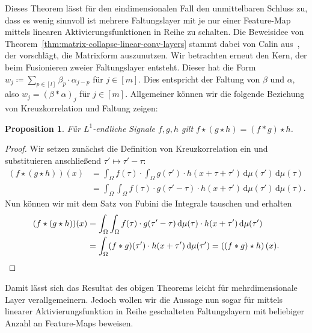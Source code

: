 \documentclass[paper=a4, 	%
		fontsize=11pt,
		abstract=true, 	%
		headsepline, 	%
		notitlepage	%
		]{scrartcl}
\newtheorem{proposition}[theorem]{Proposition}
\theoremstyle{definition}
\newcommand{\diff}{\,\textrm{d}}
\newcommand{\fNat}[1]{[ #1 ]}
\begin{document}
Dieses Theorem lässt für den eindimensionalen Fall den unmittelbaren Schluss zu, dass es wenig sinnvoll ist mehrere Faltungslayer mit je nur einer Feature-Map mittels linearen Aktivierungsfunktionen in Reihe zu schalten.
Die Beweisidee von Theorem~\ref{thm:matrix-collapse-linear-conv-layers} stammt dabei von Calin aus~\cite{Calin2020}, der vorschlägt, die Matrixform auszunutzen.
Wir betrachten erneut den Kern, der beim Fusionieren zweier Faltungslayer entsteht.
Dieser hat die Form $w_j \coloneqq \sum_{p\in\fNat{l}} \beta_p \cdot \alpha_{j-p}$ für $j\in\fNat{m}$.
Dies entspricht der Faltung von $\beta$ und $\alpha$, also $w_j = (\beta * \alpha)_j$ für $j\in\fNat{m}$.
Allgemeiner können wir die folgende Beziehung von Kreuzkorrelation und Faltung zeigen:
\begin{proposition}\label{prop:associativity-cross-corr}
    Für $L^1$-endliche Signale $f,g,h$ gilt $f\star (g \star h) = (f*g)\star h$.
\end{proposition}
\begin{proof}
    Wir setzen zunächst die Definition von Kreuzkorrelation ein und substituieren anschließend $\tau' \mapsto \tau' - \tau$:
    \begin{align*}
        (f\star (g\star h))(x)
        &= \int_\Omega f(\tau) \cdot \int_\Omega g(\tau') \cdot h(x+\tau+\tau')\diff\mu(\tau') \diff \mu(\tau) \\
        &= \int_\Omega \int_\Omega f(\tau) \cdot g(\tau' - \tau)\cdot h(x+\tau')\diff\mu(\tau') \diff \mu(\tau).
    \end{align*}
    Nun können wir mit dem Satz von Fubini die Integrale tauschen und erhalten
    \begin{align*}
        (f\star (g\star h))(x)&= \int_\Omega\int_\Omega f(\tau) \cdot g(\tau'-\tau) \diff\mu(\tau) \cdot h(x+\tau')\diff\mu(\tau') \\
        &= \int_\Omega  (f * g)(\tau')\cdot h(x+\tau') \diff \mu(\tau')
        = \left( (f * g) \star h \right)(x).\qedhere
    \end{align*}
\end{proof}

Damit lässt sich das Resultat des obigen Theorems leicht für mehrdimensionale Layer verallgemeinern.
Jedoch wollen wir die Aussage nun sogar für mittels linearer Aktivierungsfunktion in Reihe geschalteten Faltungslayern mit beliebiger Anzahl an Feature-Maps beweisen.
\end{document}
